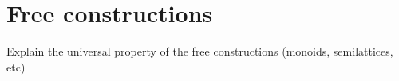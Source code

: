 
\section{Free constructions}

Explain the universal property of the free constructions (monoids, semilattices, etc)


